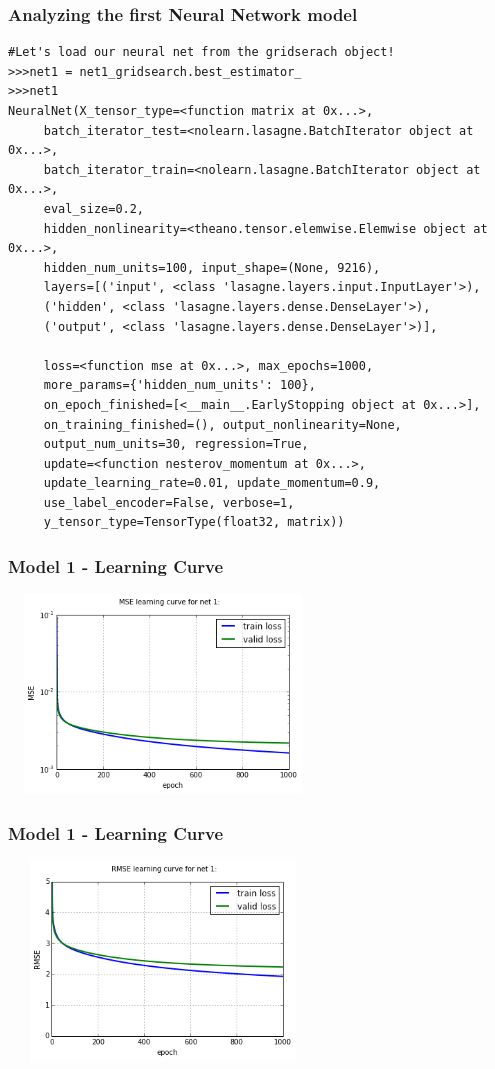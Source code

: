 \documentclass{beamer}
\begin{document}
\begin{frame}[fragile]
\frametitle{Analyzing the first Neural Network model}
\begin{verbatim}
#Let's load our neural net from the gridserach object!
>>>net1 = net1_gridsearch.best_estimator_
>>>net1
NeuralNet(X_tensor_type=<function matrix at 0x...>,
     batch_iterator_test=<nolearn.lasagne.BatchIterator object at 0x...>,
     batch_iterator_train=<nolearn.lasagne.BatchIterator object at 0x...>,
     eval_size=0.2,
     hidden_nonlinearity=<theano.tensor.elemwise.Elemwise object at 0x...>,
     hidden_num_units=100, input_shape=(None, 9216),
     layers=[('input', <class 'lasagne.layers.input.InputLayer'>),
     ('hidden', <class 'lasagne.layers.dense.DenseLayer'>),
     ('output', <class 'lasagne.layers.dense.DenseLayer'>)],
     
     loss=<function mse at 0x...>, max_epochs=1000,
     more_params={'hidden_num_units': 100},
     on_epoch_finished=[<__main__.EarlyStopping object at 0x...>],
     on_training_finished=(), output_nonlinearity=None,
     output_num_units=30, regression=True,
     update=<function nesterov_momentum at 0x...>,
     update_learning_rate=0.01, update_momentum=0.9,
     use_label_encoder=False, verbose=1,
     y_tensor_type=TensorType(float32, matrix))
\end{verbatim}
\end{frame}


\begin{frame}[fragile]
\frametitle{Model 1 - Learning Curve}
\includegraphics[width=310px,height=200px]{net1_learningMSE.png}
\end{frame}

\begin{frame}[fragile]
\frametitle{Model 1 - Learning Curve}
\includegraphics[width=310px,height=200px]{net1_learningRMSE.png}
\end{frame}
\end{document}
